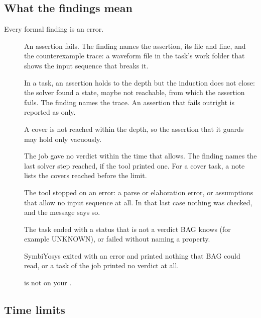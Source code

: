 

\subsection{What the findings mean}

Every formal finding is an error.

\begin{description}
\item[] An assertion fails. The finding names the assertion, its
  file and line, and the counterexample trace: a waveform file in the task's work folder
  that shows the input sequence that breaks it.
\item[] In a  task, an assertion holds to the depth
  but the induction does not close: the solver found a state, maybe not reachable, from
  which the assertion fails. The finding names the trace. An assertion that fails
  outright is reported as  only.
\item[] A cover is not reached within the depth, so the assertion
  that it guards may hold only vacuously.
\item[] The job gave no verdict within the time that
   allows. The finding names the last solver step reached, if the tool
  printed one. For a cover
  task, a note lists the covers reached before the limit.
\item[] The tool stopped on an error: a parse or elaboration error,
  or assumptions that allow no input sequence at all. In that last case nothing was
  checked, and the message says so.
\item[] The task ended with a status that is not a verdict BAG
  knows (for example UNKNOWN), or failed without naming a property.
\item[] SymbiYosys exited with an error and printed nothing that BAG
  could read, or a task of the job printed no verdict at all.
\item[]  is not on your .
\end{description}

\subsection{Time limits}

